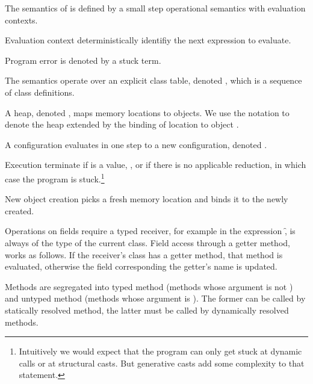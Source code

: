 \documentclass[a4paper,USenglish]{tex/lipics-v2016}
\begin{document}

The semantics of \kafka is defined by a small step operational semantics with
evaluation contexts.

Evaluation context deterministically identifiy the next expression to evaluate.

Program error is denoted by a stuck term.

The semantics operate over an explicit class table, denoted \K, which is a
sequence of class definitions.

A heap, denoted \s, maps memory locations to
objects. We use the notation \Map\s{\Bind\a{\obj\C{\b\a}}} to denote the
heap \s extended by the binding of location \a to object \obj\C{\b\a}.

A configuration \K\e\s evaluates in one step to a new configuration, denoted
\Reduce \K\e\s \Kp\ep\sp.

Execution terminate if \ep\xspace is a value, \a, or if there is no applicable
reduction, in which case the program is stuck.\footnote{Intuitively we would
  expect that the program can only get stuck at dynamic calls or at
  structural casts. But generative casts add some complexity to that
  statement.}

New object creation picks a fresh memory location  and binds it to the
newly created.

Operations on fields require a typed receiver, for example in the expression
\Get\this\f, \this is always of the type of the current class. Field access
through a getter method, works as follows. If the receiver's class has a
getter method, that method is evaluated, otherwise the field corresponding
the getter's name is updated.

Methods are segregated into typed method (methods whose argument is not
\any) and untyped method (methods whose argument is \any). The former can be
called by statically resolved method, the latter must be called by
dynamically resolved methods.
\end{document}
